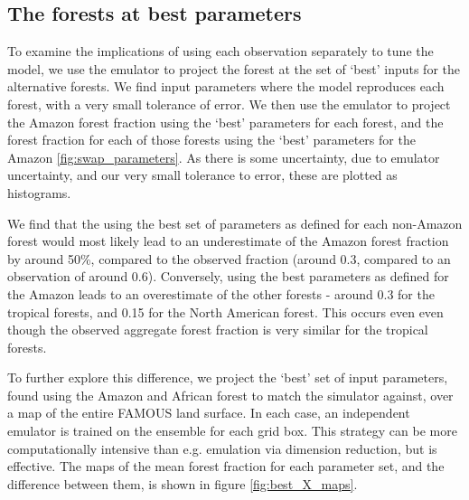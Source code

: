 \documentclass[esd, manuscript]{copernicus}
\begin{document}
\subsection{The forests at best parameters}\label{ssec:bestparameters}
To examine the implications of using each observation separately to tune the model, we use the emulator to project the forest at the set of `best' inputs for the alternative forests. We find input parameters where the model reproduces each forest, with a very small tolerance of error. We then use the emulator to project the Amazon forest fraction using the `best' parameters for each forest, and the forest fraction for each of those forests using the `best' parameters for the Amazon \ref{fig:swap_parameters}. As there is some uncertainty, due to emulator uncertainty, and our very small tolerance to error, these are plotted as histograms.

We find that the using the best set of parameters as defined for each non-Amazon forest would most likely lead to an underestimate of the Amazon forest fraction by around 50\%, compared to the observed fraction (around 0.3, compared to an observation of around 0.6). Conversely, using the best parameters as defined for the Amazon leads to an overestimate of the other forests - around 0.3 for the tropical forests, and 0.15 for the North American forest. This occurs even even though the observed aggregate forest fraction is very similar for the tropical forests.


To further explore this difference, we project the `best' set of input parameters, found using the Amazon and African forest to match the simulator against, over a map of the entire FAMOUS land surface. In each case, an independent emulator is trained on the ensemble for each grid box. This strategy can be more computationally intensive than e.g. emulation via dimension reduction, but is effective. The maps of the mean forest fraction for each parameter set, and the difference between them, is shown in figure \ref{fig:best_X_maps}.

\end{document}

